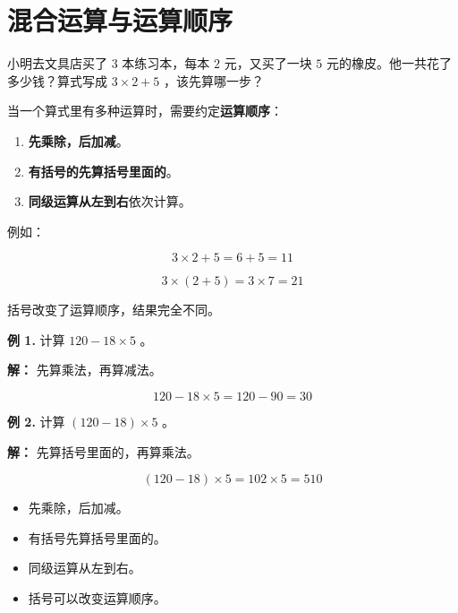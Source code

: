 \section*{混合运算与运算顺序}


\begin{explore}


小明去文具店买了 $3$ 本练习本，每本 $2$ 元，又买了一块 $5$ 元的橡皮。他一共花了多少钱？算式写成 $3 \times 2 + 5$ ，该先算哪一步？

\end{explore}

\begin{understand}


当一个算式里有多种运算时，需要约定\textbf{运算顺序}：

\begin{enumerate}
  \item \textbf{先乘除，后加减}。
  \item \textbf{有括号的先算括号里面的}。
  \item \textbf{同级运算从左到右}依次计算。
\end{enumerate}


例如：

\[
3 \times 2 + 5 = 6 + 5 = 11
\]


\[
3 \times (2 + 5) = 3 \times 7 = 21
\]


括号改变了运算顺序，结果完全不同。

\end{understand}

\begin{workedexamples}


\textbf{例 1.} 计算 $120 - 18 \times 5$ 。

\textbf{解：} 先算乘法，再算减法。

\[
120 - 18 \times 5 = 120 - 90 = 30
\]


\textbf{例 2.} 计算 $(120 - 18) \times 5$ 。

\textbf{解：} 先算括号里面的，再算乘法。

\[
(120 - 18) \times 5 = 102 \times 5 = 510
\]


\end{workedexamples}

\begin{keytakeaway}


\begin{itemize}
  \item 先乘除，后加减。
  \item 有括号先算括号里面的。
  \item 同级运算从左到右。
  \item 括号可以改变运算顺序。
\end{itemize}


\end{keytakeaway}

